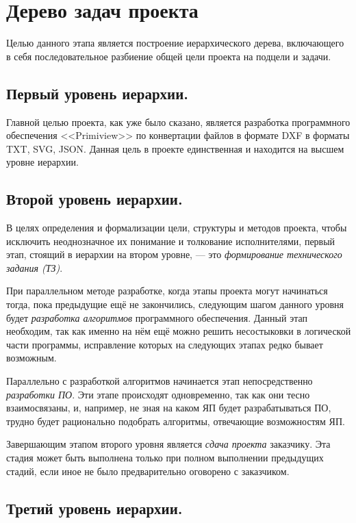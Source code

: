 \section{Дерево задач проекта}

Целью данного этапа является построение иерархического дерева, включающего в себя последовательное разбиение общей цели проекта на подцели и задачи.

\subsection{Первый уровень иерархии.}

Главной целью проекта, как уже было сказано, является разработка программного обеспечения <<Primiview>> по конвертации файлов в формате DXF в форматы TXT, SVG, JSON. Данная цель в проекте единственная и находится на высшем уровне иерархии.

\subsection{Второй уровень иерархии.}

В целях определения и формализации цели, структуры и методов проекта, чтобы исключить неоднозначное их понимание и толкование исполнителями, первый этап, стоящий в иерархии на втором уровне, --- это \textit{формирование технического задания (ТЗ)}.

При параллельном методе разработке, когда этапы проекта могут начинаться тогда, пока предыдущие ещё не закончились, следующим шагом данного уровня будет \textit{разработка алгоритмов} программного обеспечения. Данный этап необходим, так как именно на нём ещё можно решить несостыковки в логической части программы, исправление которых на следующих этапах редко бывает возможным.

Параллельно с разработкой алгоритмов начинается этап непосредственно \textit{разработки ПО}. Эти этапе происходят одновременно, так как они тесно взаимосвязаны, и, например, не зная на каком ЯП будет разрабатываться ПО, трудно будет рационально подобрать алгоритмы, отвечающие возможностям ЯП.

Завершающим этапом второго уровня является \textit{сдача проекта} заказчику. Эта стадия может быть выполнена только при полном выполнении предыдущих стадий, если иное не было предварительно оговорено с заказчиком.

\subsection{Третий уровень иерархии.}

